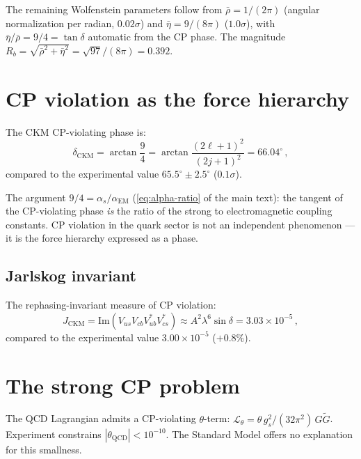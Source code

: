 \documentclass[11pt,letterpaper]{article}
\numberwithin{equation}{section}
\begin{document}
The remaining Wolfenstein parameters follow from
$\bar{\rho} = 1/(2\pi)$ (angular normalization per radian, $0.02\sigma$)
and $\bar{\eta} = 9/(8\pi)$ ($1.0\sigma$), with
$\bar{\eta}/\bar{\rho} = 9/4 = \tan\delta$ automatic from the CP phase.
The magnitude $R_b = \sqrt{\bar{\rho}^2 + \bar{\eta}^2}
= \sqrt{97}/(8\pi) = 0.392$.

\section{CP violation as the force hierarchy}
\label{sec:cp}

The CKM CP-violating phase is:
\begin{equation}\label{eq:delta-ckm}
  \delta_\mathrm{CKM} = \arctan\!\frac{9}{4}
  = \arctan\!\frac{(2\ell+1)^2}{(2j+1)^2}
  = 66.04^\circ\,,
\end{equation}
compared to the experimental value $65.5^\circ \pm 2.5^\circ$
($0.1\sigma$).

The argument $9/4 = \alpha_s/\alpha_\mathrm{EM}$
(\cref{eq:alpha-ratio} of the main text): the tangent of the
CP-violating phase \emph{is} the ratio of the strong to
electromagnetic coupling constants.  CP violation in the quark sector
is not an independent phenomenon --- it is the force hierarchy
expressed as a phase.

\subsection{Jarlskog invariant}

The rephasing-invariant measure of CP violation:
\begin{equation}
  J_\mathrm{CKM} = \mathrm{Im}(V_{us}V_{cb}V_{ub}^*V_{cs}^*)
  \approx A^2\lambda^6\sin\delta
  = 3.03 \times 10^{-5}\,,
\end{equation}
compared to the experimental value $3.00 \times 10^{-5}$ ($+0.8\%$).

\section{The strong CP problem}
\label{sec:strong-cp}

The QCD Lagrangian admits a CP-violating $\theta$-term:
$\mathcal{L}_\theta = \theta\,g_s^2/(32\pi^2)\,G\tilde{G}$.
Experiment constrains $|\theta_\mathrm{QCD}| < 10^{-10}$.  The
Standard Model offers no explanation for this smallness.
\end{document}
